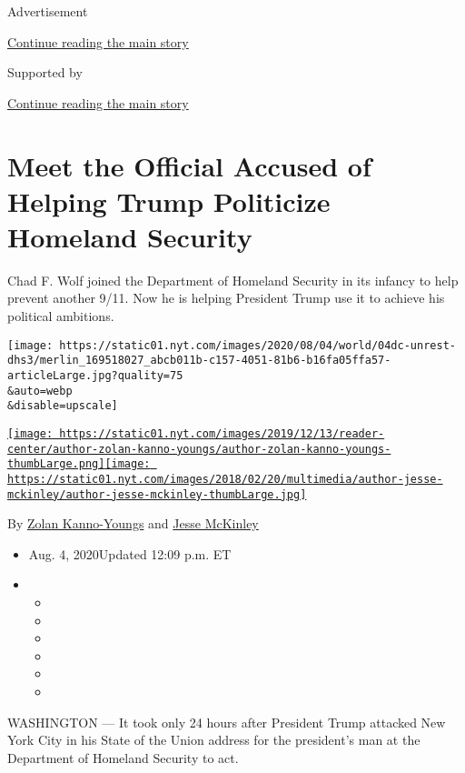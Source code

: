Advertisement

\protect\hyperlink{after-top}{Continue reading the main story}

Supported by

\protect\hyperlink{after-sponsor}{Continue reading the main story}

\hypertarget{meet-the-official-accused-of-helping-trump-politicize-homeland-security}{%
\section{Meet the Official Accused of Helping Trump Politicize Homeland
Security}\label{meet-the-official-accused-of-helping-trump-politicize-homeland-security}}

Chad F. Wolf joined the Department of Homeland Security in its infancy
to help prevent another 9/11. Now he is helping President Trump use it
to achieve his political ambitions.

\texttt{[image: https://static01.nyt.com/images/2020/08/04/world/04dc-unrest-dhs3/merlin\_169518027\_abcb011b-c157-4051-81b6-b16fa05ffa57-articleLarge.jpg?quality=75\\\&auto=webp\\\&disable=upscale]}

\href{https://www.nytimes.com/by/zolan-kanno-youngs}{\texttt{[image: https://static01.nyt.com/images/2019/12/13/reader-center/author-zolan-kanno-youngs/author-zolan-kanno-youngs-thumbLarge.png]}}\href{https://www.nytimes.com/by/jesse-mckinley}{\texttt{[image: https://static01.nyt.com/images/2018/02/20/multimedia/author-jesse-mckinley/author-jesse-mckinley-thumbLarge.jpg]}}

By \href{https://www.nytimes.com/by/zolan-kanno-youngs}{Zolan
Kanno-Youngs} and \href{https://www.nytimes.com/by/jesse-mckinley}{Jesse
McKinley}

\begin{itemize}
\item
  Aug. 4, 2020Updated 12:09 p.m. ET
\item
  \begin{itemize}
  \item
  \item
  \item
  \item
  \item
  \item
  \end{itemize}
\end{itemize}

WASHINGTON --- It took only 24 hours after President Trump attacked New
York City in his State of the Union address for the president's man at
the Department of Homeland Security to act.

